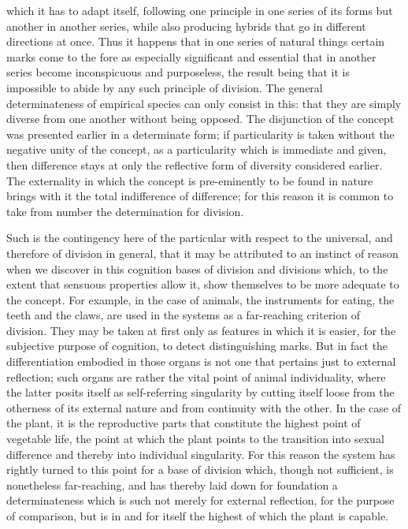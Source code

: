 which it has to adapt itself,
following one principle in one series of its
forms but another in another series,
while also producing hybrids that go
in different directions at once.
Thus it happens that in one series of natural
things certain marks come to the fore
as especially significant and essential
that in another series become inconspicuous and purposeless,
the result being that it is impossible to abide
by any such principle of division.
The general determinateness of empirical species
can only consist in this:
that they are simply diverse from one another
without being opposed.
The disjunction of the concept was
presented earlier in a determinate form;
if particularity is taken without
the negative unity of the concept,
as a particularity which is immediate and given,
then difference stays at only the reflective form of
diversity considered earlier.
The externality in which the concept is
pre-eminently to be found in nature
brings with it the total indifference of difference;
for this reason it is common to take from number
the determination for division.

Such is the contingency here of the particular
with respect to the universal,
and therefore of division in general,
that it may be attributed to an instinct of reason
when we discover in this cognition
bases of division and divisions which,
to the extent that sensuous properties allow it,
show themselves to be more adequate to the concept.
For example, in the case of animals,
the instruments for eating,
the teeth and the claws,
are used in the systems as
a far-reaching criterion of division.
They may be taken at first only as
features in which it is easier,
for the subjective purpose of cognition,
to detect distinguishing marks.
But in fact the differentiation
embodied in those organs is not one
that pertains just to external reflection;
such organs are rather
the vital point of animal individuality,
where the latter posits itself as
self-referring singularity
by cutting itself loose from
the otherness of its external nature
and from continuity with the other.
In the case of the plant,
it is the reproductive parts
that constitute the highest point of vegetable life,
the point at which the plant points to
the transition into sexual difference
and thereby into individual singularity.
For this reason the system has rightly turned to
this point for a base of division
which, though not sufficient,
is nonetheless far-reaching,
and has thereby laid down
for foundation a determinateness
which is such not merely
for external reflection,
for the purpose of comparison,
but is in and for itself
the highest of which the plant is capable.

